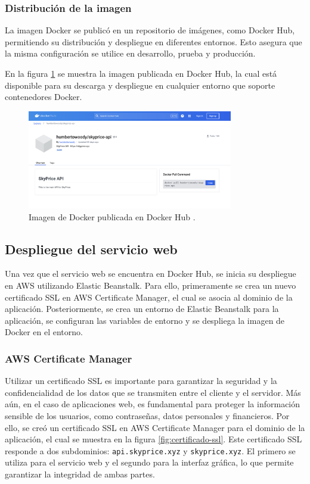 \subsubsection{Distribución de la imagen}
La imagen Docker se publicó en un repositorio de imágenes, como Docker Hub, permitiendo su distribución y despliegue en diferentes entornos. Esto asegura que la misma configuración se utilice en desarrollo, prueba y producción.

En la figura \ref{fig:docker-hub} se muestra la imagen publicada en Docker Hub, la cual está disponible para su descarga y despliegue en cualquier entorno que soporte contenedores Docker.

\begin{figure}[H]
    \centering
    \includegraphics[width=0.8\textwidth]{imagenes/05-implementacion/despliegue/dockerhub.png}
    \caption{Imagen de Docker publicada en Docker Hub \cite{skypricedockerhub}.}
    \label{fig:docker-hub}
\end{figure}

\subsection{Despliegue del servicio web}
Una vez que el servicio web se encuentra en Docker Hub, se inicia su despliegue
en AWS utilizando Elastic Beanstalk. Para ello, primeramente se crea un nuevo
certificado SSL en AWS Certificate Manager, el cual se asocia al dominio de la
aplicación. Posteriormente, se crea un entorno de Elastic Beanstalk para la
aplicación, se configuran las variables de entorno y se despliega la imagen de
Docker en el entorno.

\subsubsection{AWS Certificate Manager}
Utilizar un certificado SSL es importante para garantizar la seguridad y la
confidencialidad de los datos que se transmiten entre el cliente y el servidor.
Más aún, en el caso de aplicaciones web, es fundamental para proteger la
información sensible de los usuarios, como contraseñas, datos personales y
financieros. Por ello, se creó un certificado SSL en AWS Certificate Manager
para el dominio de la aplicación, el cual se muestra en la figura
\ref{fig:certificado-ssl}. Este certificado SSL responde a dos subdominios:
\texttt{api.skyprice.xyz} y \texttt{skyprice.xyz}. El primero se utiliza para
el servicio web y el segundo para la interfaz gráfica, lo que permite garantizar
la integridad de ambas partes.

